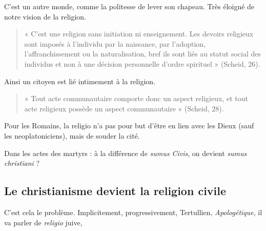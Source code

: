 C'est un autre monde, comme la politesse de lever son chapeau. Très éloigné de notre vision de la religion.

\begin{quote}
     « C’est une religion sans initiation ni enseignement. Les devoirs religieux sont imposés à l’individu par la naissance, par l’adoption, l’affranchissement ou la naturalisation, bref ils sont liés au statut social des individus et non à une décision personnelle d’ordre spirituel » (Scheid, 26).
\end{quote}

Ainsi un citoyen est lié intimement à la religion. 
\begin{quote}
    « Tout acte communautaire comporte donc un aspect religieux, et tout acte religieux possède un aspect communautaire » (Scheid, 28).
\end{quote}

\begin{Synthesis}
Pour les Romains, la religio n'a pas pour but d'être en lien avec les Dieux (sauf les neoplatoniciens), mais de souder la cité.
\end{Synthesis}
Dans les actes des martyrs : à la différence de \textit{sumus Civis}, on devient \textit{sumus christiani} ?

\subsection{Le christianisme devient la religion civile}

C'est cela le problème. Implicitement, progressivement, 
Tertullien, \textit{Apologétique}, il va parler de \textit{religio} juive, 

